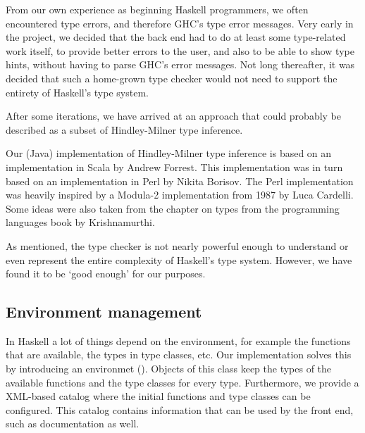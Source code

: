 From our own experience as beginning Haskell programmers, we often encountered type errors, and therefore GHC's type error messages.
Very early in the project, we decided that the back end had to do at least some type-related work itself, to provide better errors to the user, and also to be able to show type hints, without having to parse GHC's error messages.
Not long thereafter, it was decided that such a home-grown type checker would not need to support the entirety of Haskell's type system.

After some iterations, we have arrived at an approach that could probably be described as a subset of Hindley-Milner type inference.  

Our (Java) implementation of Hindley-Milner type inference is based on an implementation in Scala by Andrew Forrest\cite{forrest}.
This implementation was in turn based on an implementation in Perl by Nikita Borisov\cite{borisov}.
The Perl implementation was heavily inspired by a Modula-2 implementation from 1987 by Luca Cardelli\cite{cardelli}.
Some ideas were also taken from the chapter on types from the programming languages book by Krishnamurthi\cite{plai}.

As mentioned, the type checker is not nearly powerful enough to understand or even represent the entire complexity of Haskell's type system.
However, we have found it to be `good enough' for our purposes.

\subsection{Environment management}

In Haskell a lot of things depend on the environment, for example the functions that are available, the types in type classes, etc.
Our implementation solves this by introducing an environmet ().
Objects of this class keep the types of the available functions and the type classes for every type.
Furthermore, we provide a XML-based catalog where the initial functions and type classes can be configured.
This catalog contains information that can be used by the front end, such as documentation as well.
